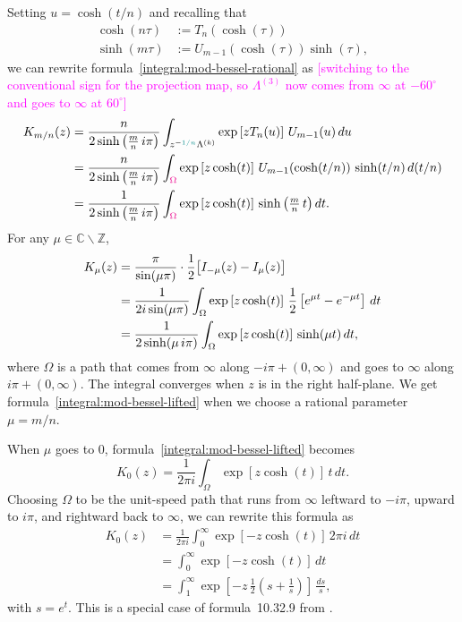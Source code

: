 \documentclass{article}
\newcommand{\Z}{\mathbb{Z}}
\newcommand{\C}{\mathbb{C}}
\begin{document}
Setting $u = \cosh(t/n)$ and recalling that
\begin{align*}
\cosh(n\tau) & := T_n(\cosh(\tau)) \\
\sinh(m\tau) & := U_{m-1}(\cosh(\tau)) \sinh(\tau),
\end{align*}
we can rewrite formula~\ref{integral:mod-bessel-rational} as \textcolor{magenta}{[switching to the conventional sign for the projection map, so $\Lambda^{(3)}$ now comes from $\infty$ at $-60^\circ$ and goes to $\infty$ at $60^\circ$]}
\begin{align}
\notag K_{m/n}(z) & = \frac{n}{2 \sinh\big(\tfrac{m}{n}\,i\pi\big)} \int_{z^{-\textcolor{DarkCyan}{1/n}}\Lambda^{(k)}} \exp\left[z T_n(u)\right]\,U_{m-1}(u)\,du \\
\notag & = \frac{n}{2 \sinh\big(\tfrac{m}{n}\,i\pi\big)} \int_{\textcolor{magenta}{\Omega}} \exp\left[z \cosh(t)\right]\,U_{m-1}(\cosh(t/n))\,\sinh(t/n)\,d(t/n) \\
\label{integral:mod-bessel-lifted} & = \frac{1}{2 \sinh\big(\tfrac{m}{n}\,i\pi\big)} \int_{\textcolor{magenta}{\Omega}} \exp\left[z \cosh(t)\right]\,\sinh\big(\tfrac{m}{n}\,t\big)\,dt.
\end{align}
For any $\mu \in \C \smallsetminus \Z$, 
\begin{align}
\notag K_\mu(z) & = \frac{\pi}{\sin(\mu \pi)} \cdot \frac{1}{2}\big[ I_{-\mu}(z) - I_\mu(z) \big] \\
\notag & = \frac{1}{2i \sin(\mu \pi)} \int_\Omega \exp\left[z \cosh(t)\right]\,\frac{1}{2}\left[e^{\mu t} - e^{-\mu t}\right]\,dt \\
\label{intgral:mod-bessel-general} & = \frac{1}{2 \sinh(\mu\,i\pi)} \int_\Omega \exp\left[z \cosh(t)\right]\,\sinh(\mu t)\,dt,
\end{align}
where $\Omega$ is a path that comes from $\infty$ along $-i \pi + (0, \infty)$ and goes to $\infty$ along $i \pi + (0, \infty)$. The integral converges when $z$ is in the right half-plane. We get formula~\eqref{integral:mod-bessel-lifted} when we choose a rational parameter $\mu = m/n$.

When $\mu$ goes to $0$, formula~\eqref{integral:mod-bessel-lifted} becomes
\[ K_0(z) = \frac{1}{2\pi i} \int_\Omega \exp\left[z \cosh(t)\right]\,t\,dt. \]
Choosing $\Omega$ to be the unit-speed path that runs from $\infty$ leftward to $-i\pi$, upward to $i\pi$, and rightward back to $\infty$, we can rewrite this formula as
\begin{align*}
K_0(z) & = \frac{1}{2\pi i} \int_0^\infty \exp\left[-z \cosh(t)\right]\,2\pi i\,dt \\
& = \int_0^\infty \exp\left[-z \cosh(t)\right]\,dt \\
& = \int_1^\infty \exp\left[-z\,\tfrac{1}{2}\left(s + \tfrac{1}{s}\right)\right]\,\frac{ds}{s},
\end{align*}
with $s = e^t$. This is a special case of formula~10.32.9 from \cite{dlmf}.
\end{document}
